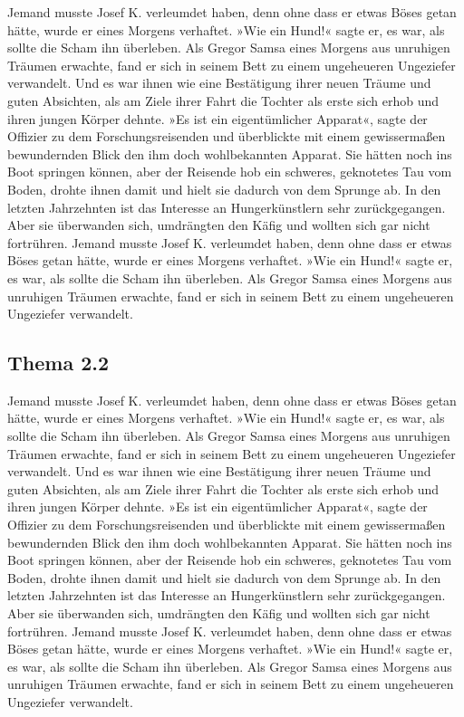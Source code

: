 Jemand musste Josef K. verleumdet haben, denn ohne dass er etwas Böses
getan hätte, wurde er eines Morgens verhaftet. »Wie ein Hund!« sagte er,
es war, als sollte die Scham ihn überleben. Als Gregor Samsa eines
Morgens aus unruhigen Träumen erwachte, fand er sich in seinem Bett zu
einem ungeheueren Ungeziefer verwandelt. Und es war ihnen wie eine
Bestätigung ihrer neuen Träume und guten Absichten, als am Ziele ihrer
Fahrt die Tochter als erste sich erhob und ihren jungen Körper dehnte.
»Es ist ein eigentümlicher Apparat«, sagte der Offizier zu dem
Forschungsreisenden und überblickte mit einem gewissermaßen bewundernden
Blick den ihm doch wohlbekannten Apparat. Sie hätten noch ins Boot
springen können, aber der Reisende hob ein schweres, geknotetes Tau vom
Boden, drohte ihnen damit und hielt sie dadurch von dem Sprunge ab. In
den letzten Jahrzehnten ist das Interesse an Hungerkünstlern sehr
zurückgegangen. Aber sie überwanden sich, umdrängten den Käfig und
wollten sich gar nicht fortrühren. Jemand musste Josef K. verleumdet
haben, denn ohne dass er etwas Böses getan hätte, wurde er eines Morgens
verhaftet. »Wie ein Hund!« sagte er, es war, als sollte die Scham ihn
überleben. Als Gregor Samsa eines Morgens aus unruhigen Träumen
erwachte, fand er sich in seinem Bett zu einem ungeheueren Ungeziefer
verwandelt.

\subsection{Thema 2.2}

Jemand musste Josef K. verleumdet haben, denn ohne dass er etwas Böses
getan hätte, wurde er eines Morgens verhaftet. »Wie ein Hund!« sagte er,
es war, als sollte die Scham ihn überleben. Als Gregor Samsa eines
Morgens aus unruhigen Träumen erwachte, fand er sich in seinem Bett zu
einem ungeheueren Ungeziefer verwandelt. Und es war ihnen wie eine
Bestätigung ihrer neuen Träume und guten Absichten, als am Ziele ihrer
Fahrt die Tochter als erste sich erhob und ihren jungen Körper dehnte.
»Es ist ein eigentümlicher Apparat«, sagte der Offizier zu dem
Forschungsreisenden und überblickte mit einem gewissermaßen bewundernden
Blick den ihm doch wohlbekannten Apparat. Sie hätten noch ins Boot
springen können, aber der Reisende hob ein schweres, geknotetes Tau vom
Boden, drohte ihnen damit und hielt sie dadurch von dem Sprunge ab. In
den letzten Jahrzehnten ist das Interesse an Hungerkünstlern sehr
zurückgegangen. Aber sie überwanden sich, umdrängten den Käfig und
wollten sich gar nicht fortrühren. Jemand musste Josef K. verleumdet
haben, denn ohne dass er etwas Böses getan hätte, wurde er eines Morgens
verhaftet. »Wie ein Hund!« sagte er, es war, als sollte die Scham ihn
überleben. Als Gregor Samsa eines Morgens aus unruhigen Träumen
erwachte, fand er sich in seinem Bett zu einem ungeheueren Ungeziefer
verwandelt.

